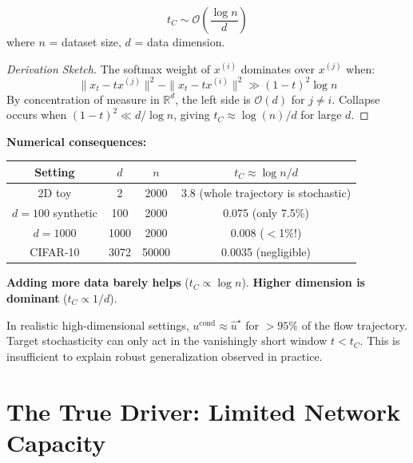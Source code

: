 \documentclass[11pt, a4paper]{article}
\newcommand{\Rd}{\mathbb{R}}
\theoremstyle{plain}
\theoremstyle{definition}
\theoremstyle{remark}
\begin{document}
\begin{thmbox}
\begin{equation}
  t_C \sim \mathcal{O}\!\left(\frac{\log n}{d}\right)
  \label{eq:collapse_time}
\end{equation}
where $n$ = dataset size, $d$ = data dimension.
\end{thmbox}

\begin{proof}[Derivation Sketch]
The softmax weight of $x^{(i)}$ dominates over $x^{(j)}$ when:
\[
  \|x_t - tx^{(j)}\|^2 - \|x_t - tx^{(i)}\|^2 \gg (1-t)^2 \log n
\]
By concentration of measure in $\Rd^d$, the left side is $\mathcal{O}(d)$ for $j \neq i$. Collapse occurs when $(1-t)^2 \ll d/\log n$, giving $t_C \approx \log(n)/d$ for large $d$.
\end{proof}

\begin{intubox}
\textbf{Numerical consequences:}
\begin{center}
\begin{tabular}{cccc}
\toprule
Setting & $d$ & $n$ & $t_C \approx \log n/d$ \\
\midrule
2D toy & 2 & 2000 & 3.8 (whole trajectory is stochastic) \\
$d=100$ synthetic & 100 & 2000 & 0.075 (only 7.5\%) \\
$d=1000$ & 1000 & 2000 & 0.008 ($<$1\%!) \\
CIFAR-10 & 3072 & 50000 & 0.0035 (negligible) \\
\bottomrule
\end{tabular}
\end{center}
\textbf{Adding more data barely helps} ($t_C \propto \log n$). \textbf{Higher dimension is dominant} ($t_C \propto 1/d$).
\end{intubox}

\begin{keybox}
In realistic high-dimensional settings, $u^{\mathrm{cond}} \approx \hat{u}^\star$ for $>95\%$ of the flow trajectory. Target stochasticity can only act in the vanishingly short window $t < t_C$. This is insufficient to explain robust generalization observed in practice.
\end{keybox}

\section{The True Driver: Limited Network Capacity}
\label{sec:capacity}
\end{document}
